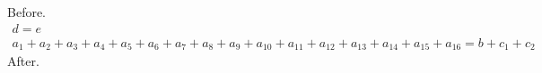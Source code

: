 \documentclass[10pt,leqno]{article}
\begin{document}
Before.
\begin{gather}
 d = e\\
 a_1 + a_2 + a_3 + a_4 + a_5 + a_6 + a_7 + a_8 + a_9 + a_{10} + a_{11} + a_{12} + a_{13} + a_{14} + a_{15} + a_{16} = b + c_1 + c_2 \tag{tag $\ast$ here}
\end{gather}
After.
\end{document}
